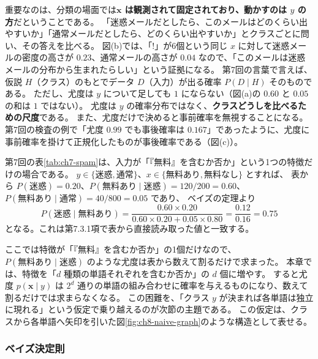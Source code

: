 重要なのは、分類の場面では\textbf{$\bm{x}$ は観測されて固定されており、動かすのは $y$ の方}だということである。
「迷惑メールだとしたら、このメールはどのくらい出やすいか」「通常メールだとしたら、どのくらい出やすいか」とクラスごとに問い、その答えを比べる。
図(b)では、「!」が6個という同じ $x$ に対して迷惑メールの密度の高さが $0.23$、通常メールの高さが $0.04$ なので、「このメールは迷惑メールの分布から生まれたらしい」という証拠になる。
第7回の言葉で言えば、仮説 $H$（クラス）のもとでデータ $D$（入力）が出る確率 $P(D \mid H)$ そのものである。
ただし、尤度は $y$ について足しても $1$ にならない（図(a)の $0.60$ と $0.05$ の和は $1$ ではない）。
尤度は $y$ の確率分布ではなく、\textbf{クラスどうしを比べるための尺度}である。
また、尤度だけで決めると事前確率を無視することになる。
第7回の検査の例で「尤度 $0.99$ でも事後確率は $0.167$」であったように、尤度に事前確率を掛けて正規化したものが事後確率である（図(c)）。

第7回の表\ref{tab:ch7-spam}は、入力が「『無料』を含むか否か」という1つの特徴だけの場合である。
$y \in \{\text{迷惑}, \text{通常}\}$、$x \in \{\text{無料あり}, \text{無料なし}\}$ とすれば、
表から $P(\text{迷惑}) = 0.20$、$P(\text{無料あり} \mid \text{迷惑}) = 120/200 = 0.60$、$P(\text{無料あり} \mid \text{通常}) = 40/800 = 0.05$ であり、
ベイズの定理より
\begin{equation*}
  P(\text{迷惑} \mid \text{無料あり}) = \frac{0.60 \times 0.20}{0.60 \times 0.20 + 0.05 \times 0.80} = \frac{0.12}{0.16} = 0.75
\end{equation*}
となる。これは第7.3.1項で表から直接読み取った値と一致する。

ここでは特徴が「『無料』を含むか否か」の1個だけなので、$P(\text{無料あり} \mid \text{迷惑})$ のような尤度は表から数えて割るだけで求まった。
本章では、特徴を「$d$ 種類の単語それぞれを含むか否か」の $d$ 個に増やす。
すると尤度 $p(\bm{x} \mid y)$ は $2^d$ 通りの単語の組み合わせに確率を与えるものになり、数えて割るだけでは求まらなくなる。
この困難を、「クラス $y$ が決まれば各単語は独立に現れる」という仮定で乗り越えるのが次節の主題である。
この仮定は、クラスから各単語へ矢印を引いた図\ref{fig:ch8-naive-graph}のような構造として表せる。

\subsubsection{ベイズ決定則}

